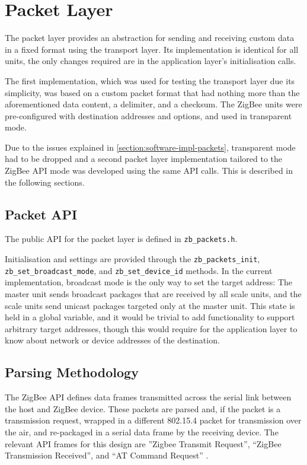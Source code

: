 \section{Packet Layer}
The packet layer provides an abstraction for sending and receiving custom data in a fixed format using the transport layer. Its implementation is identical for all units, the only changes required are in the application layer's initialisation calls.

The first implementation, which was used for testing the transport layer due its simplicity, was based on a custom packet format that had nothing more than the aforementioned data content, a delimiter, and a checksum. The ZigBee units were pre-configured with destination addresses and options, and used in transparent mode.

Due to the issues explained in \ref{section:software-impl-packets}, transparent mode had to be dropped and a second packet layer implementation tailored to the ZigBee API mode was developed using the same API calls. This is described in the following sections. 

\subsection{Packet API}
The public API for the packet layer is defined in \texttt{zb\_packets.h}. 

Initialisation and settings are provided through the \texttt{zb\_packets\_init}, \texttt{zb\_set\_broadcast\_mode}, and \texttt{zb\_set\_device\_id} methods. In the current implementation, broadcast mode is the only way to set the target address: The master unit sends broadcast packages that are received by all scale units, and the scale units send unicast packages targeted only at the master unit. This state is held in a global variable, and it would be trivial to add functionality to support arbitrary target addresses, though this would require for the application layer to know about network or device addresses of the destination.


\subsection{Parsing Methodology}
The ZigBee API defines data frames transmitted across the serial link between the host and ZigBee device. These packets are parsed and, if the packet is a transmission request, wrapped in a different 802.15.4 packet for transmission over the air, and re-packaged in a serial data frame by the receiving device. The relevant API frames for this design are ''Zigbee Transmit Request'', ``ZigBee Transmission Received'', and ``AT Command Request'' \cite[cf. section 6, API Operation]{xbee-datasheet}.

